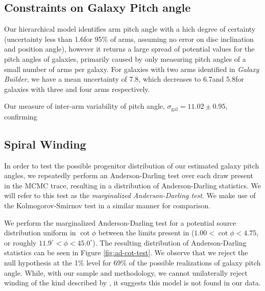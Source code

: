 \subsection{Constraints on Galaxy Pitch angle}
Our hierarchical model identifies arm pitch angle with a hich degree of certainty (uncertainty less than 1.6\degree for 95\% of arms, assuming no error on disc inclination and position angle), however it returns a large spread of potential values for the pitch angles of galaxies, primarily caused by only measuring pitch angles of a small number of arms per galaxy. For galaxies with two arms identified in \textit{Galaxy Builder}, we have a mean uncertainty of 7.8\degree, which decreases to 6.7\degree and 5.8\degree for galaxies with three and four arms respectively.

Our measure of inter-arm variability of pitch angle, $\sigma_\mathrm{gal} = 11.02 \pm 0.95$, confirming 

\subsection{Spiral Winding}
\label{section:spiral_winding}
In order to test the possible progenitor distribution of our estimated galaxy pitch angles, we repeatedly perform an Anderson-Darling test over each draw present in the MCMC trace, resulting in a distribution of Anderson-Darling statistics. We will refer to this test as the \textit{marginalized Anderson-Darling test}. We make use of the Kolmogorov-Smirnov test in a similar manner for comparison.

We perform the marginalized Anderson-Darling test for a potential source distribution uniform in $\cot\phi$ between the limits present in \citet{2019arXiv190910291P} ($1.00 < \cot\phi < 4.75$, or roughly $11.9^\circ < \phi < 45.0^\circ$). The resulting distribution of Anderson-Darling statistics can be seen in Figure \ref{fig:ad-cot-test}. We observe that we reject the null hypothesis at the 1\% level for 69\% of the possible realizations of galaxy pitch angle. While, with our sample and methodology, we cannot unilaterally reject winding of the kind described by \citet{2019arXiv190910291P}, it suggests this model is not found in our data.

